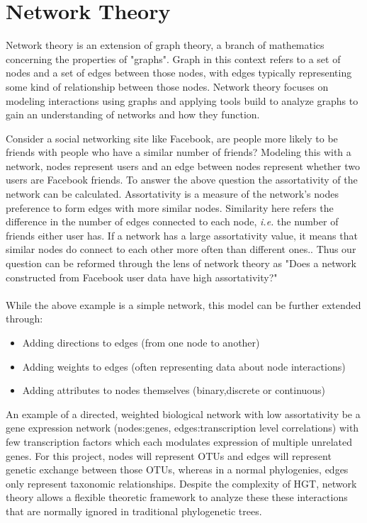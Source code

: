 \documentclass[12pt,letter]{article}
\begin{document}
\section{Network Theory}
Network theory is an extension of graph theory, a branch of mathematics concerning the properties of "graphs".
Graph in this context refers to a set of nodes and a set of edges between those nodes, with edges typically representing some kind of relationship between those nodes\citep{netgen}.
Network theory focuses on modeling interactions using graphs and applying tools build to analyze graphs to gain an understanding of networks and how they function.\par
Consider a social networking site like Facebook, are people more likely to be friends with people who have a similar number of friends?
Modeling this with a network, nodes represent users and an edge between nodes represent whether two users are Facebook friends.
To answer the above question the assortativity of the network can be calculated.
Assortativity is a measure of the network's nodes preference to form edges with more similar nodes\citep{netgen}.
Similarity here refers the difference in the number of edges connected to each node, \textit{i.e.} the number of friends either user has.
If a network has a large assortativity value, it means that similar nodes do connect to each other more often than different ones.\citep{netgen}.
Thus our question can be reformed through the lens of network theory as "Does a network constructed from Facebook user data have high assortativity?"\\\\
While the above example is a simple network, this model can be further extended through:
\begin{itemize}
    \item Adding directions to edges (from one node to another)
    \item Adding weights to edges (often representing data about node interactions)
    \item Adding attributes to nodes themselves (binary,discrete or continuous)
\end{itemize}
An example of a directed, weighted biological network with low assortativity be a gene expression network (nodes:genes, edges:transcription level correlations) with few transcription factors which each modulates expression of multiple unrelated genes.
For this project, nodes will represent OTUs and edges will represent genetic exchange between those OTUs, whereas in a normal phylogenies, edges only represent taxonomic relationships.
Despite the complexity of HGT, network theory allows a flexible theoretic framework to analyze these these interactions that are normally ignored in traditional phylogenetic trees.
\end{document}
